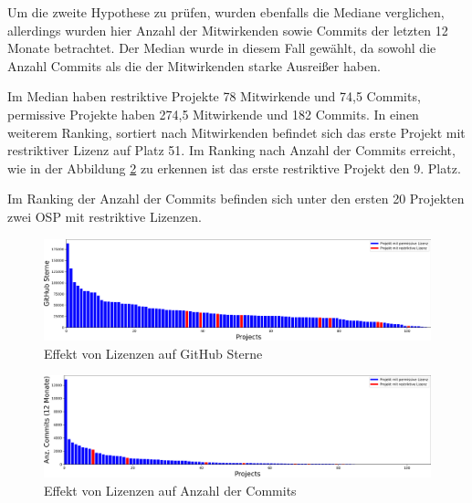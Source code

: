 \bigskip
\noindent
Um die zweite Hypothese zu prüfen, wurden ebenfalls die Mediane verglichen, allerdings wurden hier
Anzahl der Mitwirkenden sowie Commits der letzten 12 Monate betrachtet. Der Median wurde in diesem
Fall gewählt, da sowohl die Anzahl Commits als die der Mitwirkenden starke Ausreißer haben.

Im Median haben restriktive Projekte 78 Mitwirkende und 74,5 Commits, permissive Projekte haben 274,5
Mitwirkende und 182 Commits.
In einen weiterem Ranking, sortiert nach Mitwirkenden befindet sich das erste Projekt mit
restriktiver Lizenz auf Platz 51. Im Ranking nach Anzahl der Commits erreicht,
wie in der Abbildung \ref{abb:license_vs_commits} zu erkennen ist das erste restriktive Projekt 
den 9. Platz.

Im Ranking der Anzahl der Commits befinden sich unter den ersten 20 Projekten zwei OSP mit restriktive
Lizenzen.




% 

\begin{figure}[]
    \centering
    \includegraphics[scale=0.4]{figures/05/permissive_vs_restrictive_asBarChart.png}
    \caption{Effekt von Lizenzen auf GitHub Sterne}
    \label{abb:permissive_vs_restriktiv_BarChart}
\end{figure}

\begin{figure}[]
    \centering
    \includegraphics[scale=0.4]{figures/05/license_vs_last12MonthsCommits_asBarChart.png}
    \caption{Effekt von Lizenzen auf Anzahl der Commits}
    \label{abb:license_vs_commits}
\end{figure}



